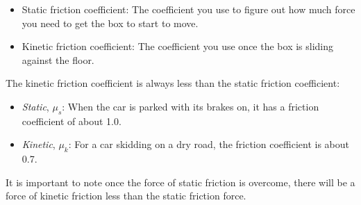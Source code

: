 \begin{itemize}
    \item Static friction coefficient: The coefficient you use to figure out how much force you need to get the box to start to move.
\item Kinetic friction coefficient: The coefficient you use once the box is sliding against the floor.
\end{itemize}

The kinetic friction coefficient is always less than the static friction coefficient:
\begin{itemize}
    \item \textit{Static}, $\mu_s$: When the car is parked with its brakes on, it has a friction coefficient of about 1.0. 
\item \textit{Kinetic}, $\mu_k$: For a car skidding on a dry road, the friction coefficient is about 0.7. 
\end{itemize}

It is important to note once the force of static friction is overcome, there will be a force of kinetic friction less than the static friction force.

